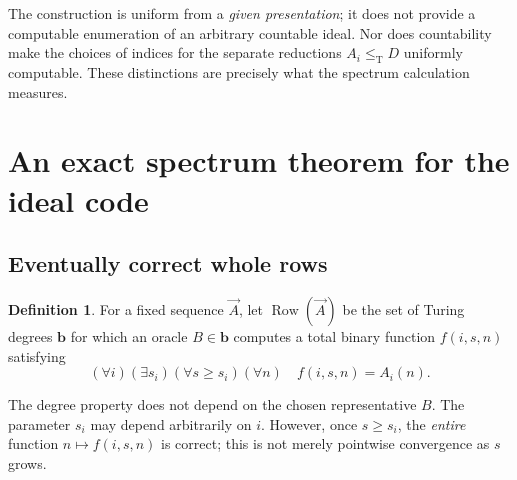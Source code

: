 \documentclass[11pt,letterpaper]{article}
\theoremstyle{plain}
\theoremstyle{definition}
\newtheorem{definition}[theorem]{Definition}
\theoremstyle{remark}
\numberwithin{equation}{section}
\newcommand{\leT}{\leq_{\mathrm T}}
\newcommand{\Row}{\operatorname{Row}}
\begin{document}
The construction is uniform from a \emph{given presentation}; it does not
provide a computable enumeration of an arbitrary countable ideal. Nor does
countability make the choices of indices for the separate reductions
$A_i\leT D$ uniformly computable. These distinctions are precisely what the
spectrum calculation measures.

\section{An exact spectrum theorem for the ideal code}\label{cr12:sec:rows}
\subsection{Eventually correct whole rows}
\begin{definition}\label{cr12:def:row}
For a fixed sequence $\vec A$, let $\Row(\vec A)$ be the set of Turing degrees
$\mathbf b$ for which an oracle $B\in\mathbf b$ computes a total binary
function $f(i,s,n)$ satisfying
\begin{equation}\label{cr12:eq:row}
 (\forall i)(\exists s_i)(\forall s\ge s_i)(\forall n)\quad
 f(i,s,n)=A_i(n).
\end{equation}
\end{definition}
The degree property does not depend on the chosen representative $B$.
The parameter $s_i$ may depend arbitrarily on $i$. However, once $s\ge s_i$,
the \emph{entire} function $n\mapsto f(i,s,n)$ is correct; this is not merely
pointwise convergence as $s$ grows.
\end{document}
